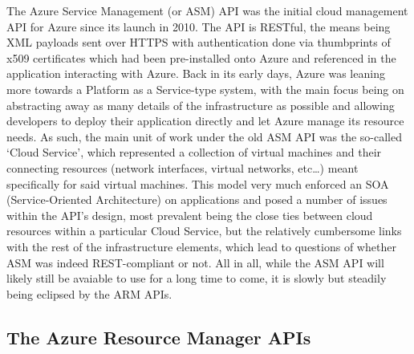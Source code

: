 \documentclass[11pt]{report}
\begin{document}
The Azure Service Management (or ASM) API was the initial cloud management API
for Azure since its launch in 2010. The API is RESTful, the means being XML
payloads sent over HTTPS with authentication done via thumbprints of x509
certificates which had been pre-installed onto Azure and referenced in the
application interacting with Azure.
Back in its early days, Azure was leaning more towards a Platform as a
Service-type system, with the main focus being on abstracting
away as many details of the infrastructure as possible and allowing developers
to deploy their application directly and let Azure manage its resource needs.
\newline
As such, the main unit of work under the old ASM API was the so-called `Cloud
Service', which represented a collection of virtual machines and their
connecting resources (network interfaces, virtual networks, etc\ldots) meant
specifically for said virtual machines. This model very much enforced an SOA
(Service-Oriented Architecture) on applications and posed a number of issues
within the API's design, most prevalent being the close ties between cloud
resources within a particular Cloud Service, but the relatively cumbersome
links with the rest of the infrastructure elements, which lead to questions of
whether ASM was indeed REST-compliant or not. \newline
All in all, while the ASM API will likely still be avaiable to use for a long
time to come, it is slowly but steadily being eclipsed by the ARM APIs.


\subsection{The Azure Resource Manager APIs}
\end{document}
